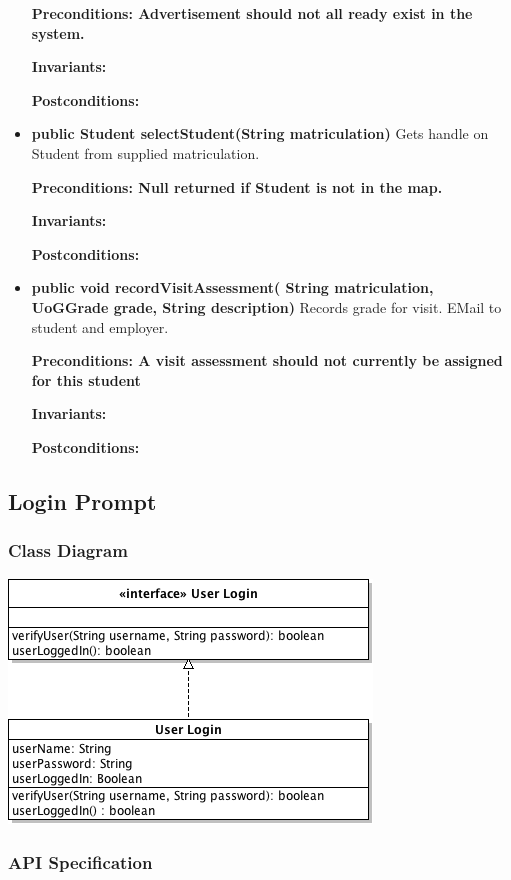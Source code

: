\documentclass[11pt]{l3deliverable}
\begin{document}
\begin{itemize}
{\textbf{Preconditions: Advertisement should not all ready exist in the
  system.}

\textbf{Invariants:} 

\textbf{Postconditions:} }
\item{\textbf{public Student selectStudent(String matriculation)}
Gets handle on Student from supplied matriculation.

\textbf{Preconditions: Null returned if Student is not in the map.}

\textbf{Invariants:} 

\textbf{Postconditions:} }
\item{\textbf{public void recordVisitAssessment( String matriculation,
    UoGGrade grade, String description)}
Records grade for visit. EMail to student and employer.

\textbf{Preconditions: A visit assessment should not currently be
  assigned for this student}

\textbf{Invariants:} 

\textbf{Postconditions:} }

\end{itemize}

\subsection{Login Prompt}

\subsubsection{Class Diagram}

\includegraphics{loginClassDiagram.png}

\subsubsection{API Specification}
\end{document}
